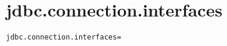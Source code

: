 \section{jdbc.connection.interfaces}
\label{configuration:JdbcConnectionInterfaces}
\AvailableInJavaOnly{\TODO}
\begin{lstlisting}[style=Props,caption={Usage example for \textit{jdbc.connection.interfaces}}]
jdbc.connection.interfaces=
\end{lstlisting}